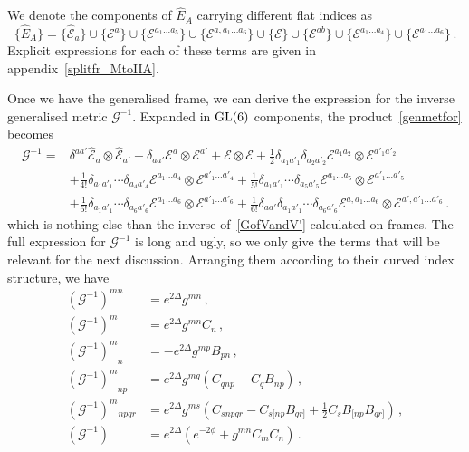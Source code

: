 \documentclass[debug]{phd}
\begin{document}
					We denote the components of $\hat{E}_A$ carrying different flat indices as
							\begin{equation*}
								\{\hat E_A\} = \{\hat{\mathcal{E}}_a\} \cup \{\mathcal{E}^a\} \cup \{\mathcal{E}^{a_1 \ldots a_5} \} \cup \{\mathcal{E}^{a,a_1\ldots a_6}\} \cup \{\mathcal{E}\} \cup \{\mathcal{E}^{ab}\} \cup \{\mathcal{E}^{a_1\ldots a_4}\} \cup \{\mathcal{E}^{a_1 \ldots a_6}\}\, . 
							\end{equation*} 
					Explicit expressions for each of these terms are given in appendix~\ref{splitfr_MtoIIA}.

					Once we have the generalised frame, we can derive the expression for the inverse generalised metric $\mathcal{G}^{-1}$. 
					Expanded in $\mathrm{GL}(6)$ components, the product~\eqref{genmetfor} becomes
							\begin{equation*}
								\begin{split}
								\mathcal{G}^{-1} =& \delta^{aa'} \hat{\mathcal{E}}_a \otimes \hat{\mathcal{E}}_{a'} + \delta_{aa'} \mathcal{E}^a \otimes \mathcal{E}^{a'} + \mathcal{E} \otimes \mathcal{E} + \tfrac{1}{2}\delta_{a_1a'_1}\delta_{a_2a'_2} \mathcal{E}^{a_1a_2} \otimes \mathcal{E}^{a'_1a'_2} \\
												& + \tfrac{1}{4!}\delta_{a_1a'_1}\cdots\delta_{a_4a'_4} \mathcal{E}^{a_1\ldots a_4} \otimes \mathcal{E}^{a'_1\ldots a'_4} + \tfrac{1}{5!}\delta_{a_1a'_1}\cdots\delta_{a_5a'_5} \mathcal{E}^{a_1\ldots a_5} \otimes \mathcal{E}^{a'_1\ldots a'_5} \\
												& + \tfrac{1}{6!}\delta_{a_1a'_1}\cdots\delta_{a_6 a'_6} \mathcal{E}^{a_1\ldots a_6} \otimes \mathcal{E}^{a'_1\ldots a'_6} + \tfrac{1}{6!}\delta_{a a'}\delta_{a_1a'_1}\cdots\delta_{a_6a'_6} \mathcal{E}^{a,a_1\ldots a_6} \otimes \mathcal{E}^{a',a'_1\ldots a'_6}\, .
								\end{split}
							\end{equation*}
					which is nothing else than the inverse of~\eqref{GofVandV'} calculated on frames.
					The full expression for $\mathcal{G}^{-1}$ is long and ugly, so we only give the terms that will be relevant for the next discussion. 
					Arranging them according to their curved index structure, we have
							\begin{equation}\label{invG_comp_1}
								\begin{split}
									(\mathcal{G}^{-1})^{mn} &= e^{2\Delta}g^{mn}\, ,\\[1mm]
									(\mathcal{G}^{-1})^{m} &= e^{2\Delta}g^{mn} C_n \, ,\\[1mm]
									(\mathcal{G}^{-1})^{m}_{\phantom{m}n} &= - e^{2\Delta}g^{mp}B_{pn}\, , \\[1mm]
									(\mathcal{G}^{-1})^{m}_{\phantom{m}np} &= e^{2\Delta}g^{mq}\left(C_{qnp} - C_{q}B_{np} \right) \, , \\[1mm]
									(\mathcal{G}^{-1})^m{}_{npqr} &= {e}^{2\Delta}g^{ms}\left(C_{snpqr} -C_{s[np}B_{qr]} + \tfrac{1}{2}C_s B_{[np}B_{qr]}\right) \, , \\[1mm]
									(\mathcal{G}^{-1}) &= e^{2\Delta}\left( e^{-2\phi} + g^{mn}C_m C_n\right)\, .
								\end{split}
							\end{equation}
\end{document}
